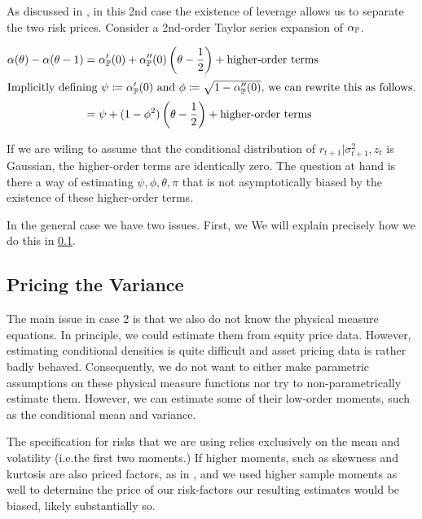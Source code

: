 \documentclass[11pt, letterpaper, twoside, final]{article}
\begin{document}
As discussed in \textcite[13]{khrapov2016affine}, in this 2nd case the existence of leverage allows us to
separate the two risk prices.
Consider a 2nd-order Taylor series expansion of $\alpha_{\mathbb{P}}$.

\begin{align}
    \alpha(\theta) - \alpha(\theta - 1) &= \alpha_{\PP}'(0) + \alpha_{\PP}''(0) \left(\theta - \frac{1}{2}\right)
        + \text{higher-order terms}  \\
%
    \intertext{Implicitly defining $\psi \coloneqq \alpha_{\PP}'(0)$ and $\phi \coloneqq \sqrt{1 -
        \alpha_{\PP}''(0)}$, we can rewrite this as follows.} 
%
    &=  \psi + (1 - \phi^2) \left(\theta - \frac{1}{2}\right) + \text{higher-order terms}  
\end{align}

If we are wiling to assume that the conditional distribution of $r_{t+1} \vert \sigma^2_{t+1}, z_t$ is Gaussian,
the higher-order terms are identically zero.
The question at hand is there a way of estimating $\psi, \phi, \theta, \pi$ that is not asymptotically biased by
the existence of these higher-order terms.

In the general case we have two issues.
First, we 
We will explain precisely how we do this in \cref{sec:pricing_the_variance}.






\subsection{Pricing the Variance}\label{sec:pricing_the_variance}


The main issue in case 2 is that we also do not know the physical measure equations.
In principle, we could estimate them from equity price data.
However, estimating conditional densities is quite difficult and asset pricing data is rather badly behaved.
Consequently, we do not want to either make parametric assumptions on these physical measure functions nor try to
non-parametrically estimate them.
However, we can estimate some of their low-order moments, such as the conditional mean and variance.


The specification for risks that we are using relies exclusively on the mean and volatility (i.e.\@ the first two
moments.)
If higher moments, such as skewness and kurtosis are also priced factors, as in \textcites{harvey2000conditional,
conrad2012exante, chang2013market},  and we used higher sample moments as well to determine the price of our
risk-factors our resulting estimates would be biased, likely substantially so. 
\end{document}
